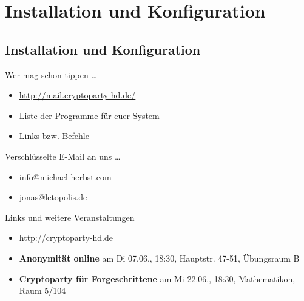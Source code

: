 \section{Installation und Konfiguration}
\subsection*{Installation und Konfiguration}
\begin{frame}{Wer mag schon tippen \dots}
	\begin{itemize}
		\item \url{http://mail.cryptoparty-hd.de/}
		\item Liste der Programme für euer System
		\item Links bzw. Befehle
	\end{itemize}
\end{frame}

\blackframe

%

\begin{frame}{Verschlüsselte E-Mail an uns \dots}
	\begin{itemize}
		\item \url{info@michael-herbst.com}
		\item \url{jonas@letopolis.de}
	\end{itemize}
\end{frame}

\blackframe

%
%
%

\begin{frame}{Links und weitere Veranstaltungen}
	\begin{itemize}
		\item \url{http://cryptoparty-hd.de} \\[10pt]
		\item \textbf{Anonymität online} am Di 07.06., 18:30, Hauptstr. 47-51, Übungsraum B
		\item \textbf{Cryptoparty für Forgeschrittene} am Mi 22.06., 18:30, Mathematikon, Raum 5/104
	\end{itemize}
\end{frame}



